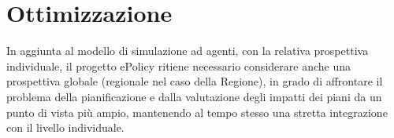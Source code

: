 








%
\clearpage{\pagestyle{empty}\cleardoublepage}
\chapter{\nohyphens{Ottimizzazione}}
In aggiunta al modello di simulazione ad agenti, con la relativa prospettiva individuale, il progetto ePolicy ritiene necessario considerare anche una prospettiva globale (regionale nel caso della Regione), in grado di affrontare il problema della pianificazione e dalla valutazione degli impatti dei piani da un punto di vista più ampio, mantenendo al tempo stesso una stretta integrazione con il livello individuale.

